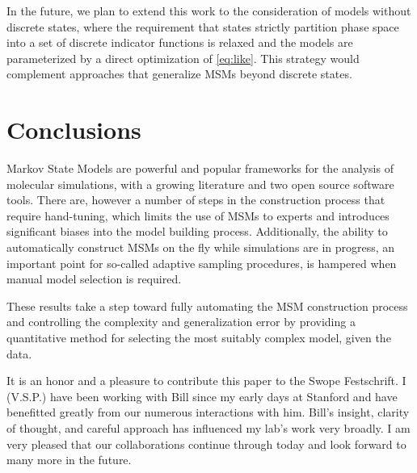 \documentclass[journal=jpcbfk, layout=traditional, manuscript=article]{achemso}
\begin{document}
In the future, we plan to extend this work to the consideration of models without discrete states, where the requirement that states strictly partition phase space into a set of discrete indicator functions is relaxed and the models are parameterized by a direct optimization of \cref{eq:like}. This strategy would complement approaches that generalize MSMs beyond discrete states\cite{Noe2013Variational}.

\section{Conclusions}

Markov State Models are powerful and popular frameworks for the analysis of molecular simulations, with a growing literature and two open source software tools\cite{Beauchamp2011Msmbuilder2, Senne2012EMMA}. There are, however a number of steps in the construction process that require hand-tuning, which limits the use of MSMs to experts and introduces significant biases into the model building process. Additionally, the ability to automatically construct MSMs on the fly while simulations are in progress, an important point for so-called adaptive sampling procedures\cite{Bowman2010Enhanced}, is hampered when manual model selection is required. 

These results take a step toward fully automating the MSM construction process and controlling the complexity and generalization error by providing a quantitative method for selecting the most suitably complex model, given the data.

\begin{acknowledgement}
It is an honor and a pleasure to contribute this paper to the Swope Festschrift.  I (V.S.P.) have been working with Bill since my early days at Stanford and have benefitted greatly from our numerous interactions with him.  Bill's insight, clarity of thought, and careful approach has influenced my lab's work very broadly.  I am very pleased that our collaborations continue through today and look forward to many more in the future.
\end{acknowledgement}


\end{document}
